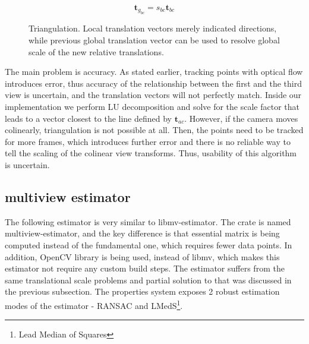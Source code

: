 \documentclass[11pt,english]{report}
\begin{document}
\begin{equation}
	\mathbf{t}_{g_{bc}} = s_{bc}\mathbf{t}_{bc}
\end{equation}

\begin{figure}[!ht]
	\centering
	\caption{\centering Triangulation. Local translation vectors merely indicated directions, while previous global translation vector can be used to resolve global scale of the new relative translations.}
\end{figure}

The main problem is accuracy. As stated earlier, tracking points with optical flow introduces error, thus accuracy of the relationship between the first and the third view is uncertain, and the translation vectors will not perfectly match. Inside our implementation we perform LU decomposition and solve for the scale factor that leads to a vector closest to the line defined by $\mathbf{t}_{ac}$. However, if the camera moves colinearly, triangulation is not possible at all. Then, the points need to be tracked for more frames, which introduces further error and there is no reliable way to tell the scaling of the colinear view transforms. Thus, usability of this algorithm is uncertain.

\subsection{multiview estimator}

The following estimator is very similar to libmv-estimator. The crate is named multiview-estimator, and the key difference is that essential matrix is being computed instead of the fundamental one, which requires fewer data points. In addition, OpenCV library is being used, instead of libmv, which makes this estimator not require any custom build steps. The estimator suffers from the same translational scale problems and partial solution to that was discussed in the previous subsection. The properties system exposes 2 robust estimation modes of the estimator - RANSAC and LMedS\footnote{Lead Median of Squares}.
\end{document}

